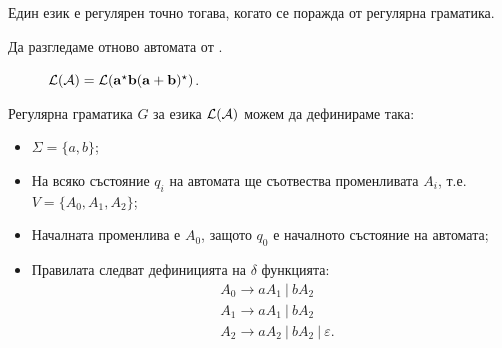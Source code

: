 \begin{important}
  \begin{theorem}
    Един език е регулярен точно тогава, когато се поражда от регулярна граматика.
  \end{theorem}
\end{important}

\begin{extra2}
\begin{example}
  Да разгледаме отново автомата от .
  \begin{figure}[H]
    \begin{center}
    \end{center}
    \caption{\scriptsize{$\mathcal{L}(\mathcal{A}) = \mathcal{L}(\mathbf{a^\star b(a+b)^\star})$.}}
  \end{figure}

  Регулярна граматика $G$ за езика $\mathcal{L}(\mathcal{A})$ можем да дефинираме така:
  \begin{itemize}
  \item
    $\Sigma = \{a,b\}$;
  \item
    На всяко състояние $q_i$ на автомата ще съотвества променливата $A_i$, т.е.
    $V = \{A_0,A_1,A_2\}$;
  \item
    Началната променлива е $A_0$, защото $q_0$ е началното състояние на автомата;
  \item
    Правилата следват дефиницията на $\delta$ функцията:
    \begin{align*}
      & A_0 \to a A_1\ |\ b A_2\\
      & A_1 \to a A_1\ |\ b A_2\\
      & A_2 \to a A_2\ |\ b A_2\ |\ \varepsilon.
    \end{align*}
  \end{itemize}
\end{example}
\end{extra2}

